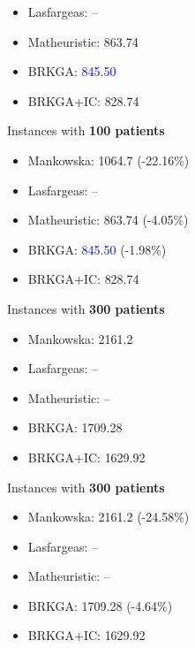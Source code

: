 {\begin{itemize}
{\begin{itemize}
            \item Lasfargeas: --
            \item Matheuristic: 863.74
            \item BRKGA: \textcolor{blue}{845.50}
            \item BRKGA+IC: \textcolor{InfRed}{828.74}
         \end{itemize}
      }
      \only<+> {
         \item Instances with \textbf{100 patients}
         \begin{itemize}
            \item Mankowska: 1064.7 \textcolor{InfRed}{(-22.16\%)}
            \item Lasfargeas: --
            \item Matheuristic: 863.74  \textcolor{InfRed}{(-4.05\%)}
            \item BRKGA: \textcolor{blue}{845.50}  \textcolor{InfRed}{(-1.98\%)}
            \item BRKGA+IC: \textcolor{InfRed}{828.74}
         \end{itemize}
      }
      \only<+> {
         \item Instances with \textbf{300 patients}
         \begin{itemize}
            \item Mankowska: 2161.2
            \item Lasfargeas: --
            \item Matheuristic: --
            \item BRKGA: 1709.28
            \item BRKGA+IC: \textcolor{InfRed}{1629.92}
         \end{itemize}
      }
      \only<+> {
         \item Instances with \textbf{300 patients}
         \begin{itemize}
            \item Mankowska: 2161.2 \textcolor{InfRed}{(-24.58\%)}
            \item Lasfargeas: --
            \item Matheuristic: --
            \item BRKGA: 1709.28  \textcolor{InfRed}{(-4.64\%)}
            \item BRKGA+IC: \textcolor{InfRed}{1629.92}
         \end{itemize}
      }
   \end{itemize}
}
